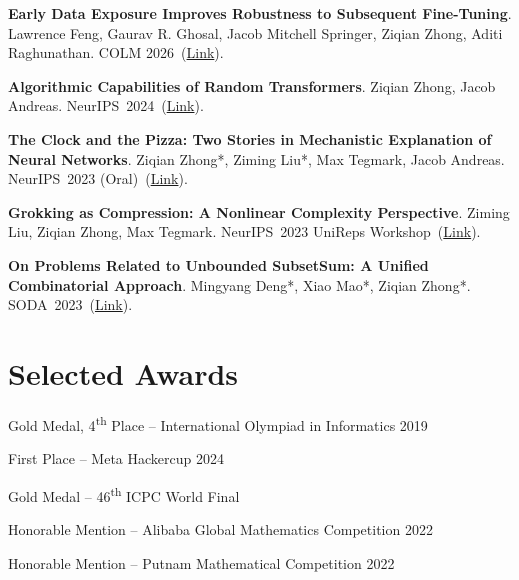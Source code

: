 \documentclass[11pt,letterpaper]{article}
\begin{document}
\begin{outerlist}
\item \textbf{Early Data Exposure Improves Robustness to Subsequent Fine-Tuning}. Lawrence Feng, Gaurav R. Ghosal, Jacob Mitchell Springer, Ziqian Zhong, Aditi Raghunathan. COLM 2026~(\href{https://arxiv.org/abs/2605.12705}{Link}).
\item \textbf{Algorithmic Capabilities of Random Transformers}. Ziqian Zhong, Jacob Andreas. NeurIPS~2024~(\href{https://papers.nips.cc/paper_files/paper/2024/file/bccdd196d798a51a4961989984a9ed4a-Paper-Conference.pdf}{Link}).
\item \textbf{The Clock and the Pizza: Two Stories in Mechanistic Explanation of Neural Networks}. Ziqian Zhong*, Ziming Liu*, Max Tegmark, Jacob Andreas. NeurIPS~2023 (Oral)~(\href{https://proceedings.neurips.cc/paper_files/paper/2023/file/56cbfbf49937a0873d451343ddc8c57d-Paper-Conference.pdf}{Link}).
\item \textbf{Grokking as Compression: A Nonlinear Complexity Perspective}. Ziming Liu, Ziqian Zhong, Max Tegmark. NeurIPS~2023 UniReps Workshop~(\href{https://arxiv.org/abs/2310.05918}{Link}).
\item \textbf{On Problems Related to Unbounded SubsetSum: A Unified Combinatorial Approach}. Mingyang Deng*, Xiao Mao*, Ziqian Zhong*. SODA~2023~(\href{https://epubs.siam.org/doi/10.1137/1.9781611977554.ch114}{Link}).
\end{outerlist}

\section*{Selected Awards}
\begin{outerlist}
\item Gold Medal, 4\textsuperscript{th} Place -- International Olympiad in Informatics 2019
\item First Place -- Meta Hackercup 2024
\item Gold Medal -- 46\textsuperscript{th} ICPC World Final
\item Honorable Mention -- Alibaba Global Mathematics Competition 2022
\item Honorable Mention -- Putnam Mathematical Competition 2022
\end{outerlist}

\end{document}
